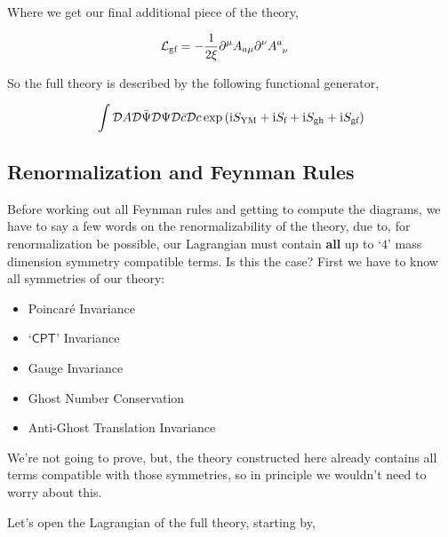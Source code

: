 Where we get our final additional piece of the theory,

\begin{align}
    \mathcal L_{\textnormal{gf}}&=-\frac{1}{2\xi}\partial^\mu A_{a\mu}\partial^\nu \tensor{A}{^a_\nu}\nonumber
\end{align}

So the full theory is described by the following functional generator,

\begin{align}
    \int\mathcal D A\mathcal D \bar\Psi\mathcal D \Psi\mathcal D \bar c\mathcal D c\exp\qty(\textnormal{i} S_{\textnormal{YM}}+\textnormal{i} S_{\textnormal{f}}+\textnormal{i} S_{\textnormal{gh}}+\textnormal{i} S_{\textnormal{gf}})
\end{align}

\subsection{Renormalization and Feynman Rules}

Before working out all Feynman rules and getting to compute the diagrams, we have to say a few words on the renormalizability of the theory, due to, for renormalization be possible, our Lagrangian must contain \textbf{all} up to `$4$' mass dimension symmetry compatible terms. Is this the case? First we have to know all symmetries of our theory:

\begin{itemize}
    \item Poincaré Invariance
    \item `$\mathsf{CPT}$' Invariance
    \item Gauge Invariance
    \item Ghost Number Conservation
    \item Anti-Ghost Translation Invariance
\end{itemize}

We're not going to prove, but, the theory constructed here already contains all terms compatible with those symmetries, so in principle we wouldn't need to worry about this. 

Let's open the Lagrangian of the full theory, starting by,


